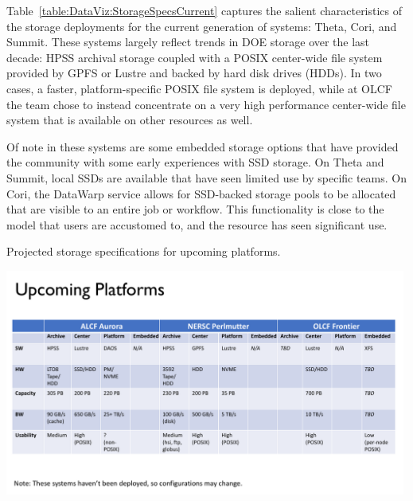 Table~\ref{table:DataViz:StorageSpecsCurrent} captures the salient
characteristics of the storage deployments for the current generation of
systems: Theta, Cori, and Summit. These systems largely reflect trends in DOE
storage over the last decade: HPSS archival storage coupled with a POSIX
center-wide file system provided by GPFS or Lustre and backed by hard disk
drives (HDDs). In two cases, a faster, platform-specific POSIX file system is 
deployed, while at OLCF the team chose to instead concentrate on a very high
performance center-wide file system that is available on other resources as well.

Of note in these systems are some embedded storage options that have
provided the community with some early experiences with SSD storage. On
Theta and Summit, local SSDs are available that have seen limited use
by specific teams. On Cori, the DataWarp service allows for SSD-backed
storage pools to be allocated that are visible to an entire job or
workflow. This functionality is close to the model that users are
accustomed to, and the resource has seen significant use.

%
%
\begin{table}[htb!]
	\vspace{-2mm}
	\centering
	\caption{\label{table:DataViz:StorageSpecsNext} Projected storage specifications for upcoming platforms.}
	\includegraphics[width=0.99\textwidth]{projects/2.3.4-DataViz/DataViz-storage-specs-next.pdf}
\end{table}

